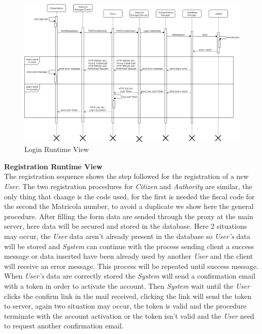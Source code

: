 \documentclass{article}
\begin{document}
\begin{figure}[H]
    \centering
    \includegraphics[scale=0.4]{img/sequence_diagrams/login_sequence.png}
    \caption{Login Runtime View}
\end{figure}  

\clearpage
\textbf{Registration Runtime View}\\
The registration sequence shows the step followed for the 
registration of a new \textit{User}. The two registration procedures for \textit{Citizen} and  
\textit{Authority} are similar, the only thing that change is the code used, for the first is 
needed the fiscal code for the second the Matricola number, to avoid a duplicate we show here 
the general procedure. After filling the form data are sended through the proxy at the main server, 
here data will be secured and stored in the database. Here 2 situations may occur, the \textit{User} 
data aren't already present in the database so \textit{User's} data will be stored and \textit{System} 
can continue with the process sending client a success message or data inserted have been already used 
by another \textit{User} and the client will receive an error message. This process will be repeated 
until success message. When \textit{User's} data are correctly stored the \textit{System} will send a 
confirmation email with a token in order to activate the account. Then \textit{System} wait until the 
\textit{User} clicks the confirm link in the mail received, clicking the link will send the token to 
server, again two situation may occur, the token is valid and the procedure terminate with the account 
activation or the token isn't valid and the \textit{User} need to request another confirmation email.
\end{document}
